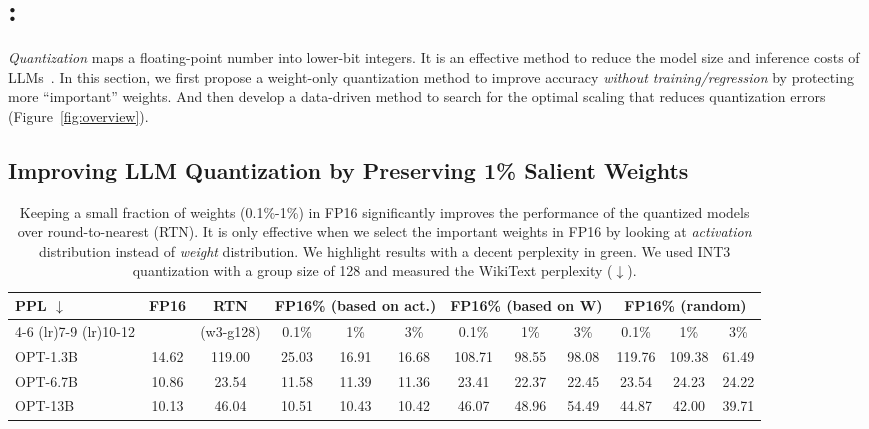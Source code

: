 \section{\methodshort: \method}

\emph{Quantization} maps a floating-point number into lower-bit integers. It is an effective method to reduce the model size and inference costs of LLMs~\cite{dettmers2022llmint8, frantar2022gptq, zeroquant, xiao2022smoothquant}. In this section, we first propose a weight-only quantization method to improve accuracy \emph{without training/regression} by protecting more ``important'' weights. And then develop a data-driven method to search for the optimal scaling that reduces quantization errors (Figure~\ref{fig:overview}). 

\subsection{Improving LLM Quantization by Preserving 1\% Salient Weights}
\renewcommand \arraystretch{1.05}
\begin{table*}[t]
    \setlength{\tabcolsep}{4.5pt}
    \small
    \centering
    \vspace{5pt}
    \begin{tabular}{lccccccccccc}
        \toprule
          \multirow{2}{*}{\textbf{PPL $\downarrow$}}   & \multirow{2}{*}{FP16} & \multirow{2}{*}{RTN}   & \multicolumn{3}{c}{FP16\% (based on act.)}  & \multicolumn{3}{c}{FP16\% (based on W)} &  \multicolumn{3}{c}{FP16\% (random)} \\ \cmidrule(lr){4-6} \cmidrule(lr){7-9}  \cmidrule(lr){10-12}
         & & (w3-g128) & 0.1\% & 1\% & 3\% &   0.1\% & 1\% & 3\% &  0.1\% & 1\% & 3\%   \\
        \midrule
        OPT-1.3B  & 14.62 & 119.00 & 25.03 & \textcolor{codegreen}{16.91} & \textcolor{codegreen}{16.68} & 108.71 & 98.55 & 98.08 & 119.76 & 109.38 & 61.49 \\
        OPT-6.7B & 10.86 & 23.54 & \textcolor{codegreen}{11.58} & \textcolor{codegreen}{11.39} & \textcolor{codegreen}{11.36} & 23.41 & 22.37 & 22.45 & 23.54 & 24.23 & 24.22 \\
        OPT-13B &  10.13 & 46.04 &\textcolor{codegreen}{10.51} & \textcolor{codegreen}{10.43} & \textcolor{codegreen}{10.42} & 46.07 & 48.96 & 54.49 & 44.87 & 42.00 & 39.71 \\
        \bottomrule
    \end{tabular}
    \caption{Keeping a small fraction of weights (0.1\%-1\%) in FP16 significantly improves the performance of the quantized models over round-to-nearest (RTN). It is only effective when we select the important weights in FP16 by looking at \emph{activation} distribution instead of \emph{weight} distribution. We highlight results with a decent perplexity in \textcolor{codegreen}{green}.  
    We used INT3 quantization with a group size of 128 and measured the WikiText perplexity ($\downarrow$).  
    } 
    \label{tab:fp_ratio}
\end{table*}

